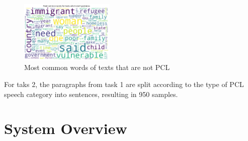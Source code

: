 \documentclass[11pt]{article}
\begin{document}
\begin{figure}[ht]
	\centering
	\includegraphics[width=0.4\textwidth]{nopcl.png}
	\caption{Most common words of texts that are not PCL}
	\label{fig4}
\end{figure}


For taks 2, the paragraphs from task 1 are split according to the type of PCL speech category into sentences, resulting in 950 samples.

\section{System Overview}
\end{document}
